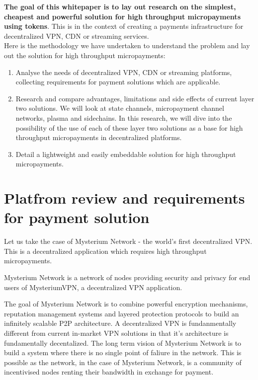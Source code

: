 \documentclass[a4paper,12pt]{article}
\begin{document}
\textbf{The goal of this whitepaper is to lay out research on the simplest, 
cheapest and powerful solution for high throughput micropayments using 
tokens}. This is in the context of creating a payments infrastructure for 
decentralized VPN, CDN or streaming services. \\

Here is the methodology we have undertaken to understand the problem and lay out
the solution for high throughput micropayments: 

\begin{enumerate}
    \item Analyse the needs of decentralized VPN, CDN or streaming platforms, 
    collecting requirements for payment solutions which are applicable.
    \item Research and compare advantages, limitations and side effects of current
    layer two solutions. We will look at state channels, micropayment channel 
    networks, plasma and sidechains. In this research, we will dive into the 
    possibility of the use of each of these layer two solutions as a base for high
    throughput micropayments in decentralized platforms.
    \item Detail a lightweight and easily embeddable solution for high throughput
    micropayments. 
\end{enumerate}

\section{Platfrom review and requirements for payment solution}

Let us take the case of Mysterium Network \cite{mysterium} - the world’s first 
decentralized VPN. This is a decentralized application which requires high throughput 
micropayments. 

Mysterium Network is a network of nodes providing security and privacy for end 
users of MysteriumVPN, a decentralized VPN application.

The goal of Mysterium Network is to combine powerful encryption mechanisms, 
reputation management systems and layered protection protocols to build an 
infinitely scalable P2P architecture. A decentralized VPN is fundanmentally 
different from current in-market VPN solutions in that it’s architecture is 
fundamentally decentalized. The long term vision of Mysterium Network is to build 
a system where there is no single point of faliure in the network. This is possible
as the network, in the case of Mysterium Network, is a community of incentivised 
nodes renting their bandwidth in exchange for payment.
\end{document}
